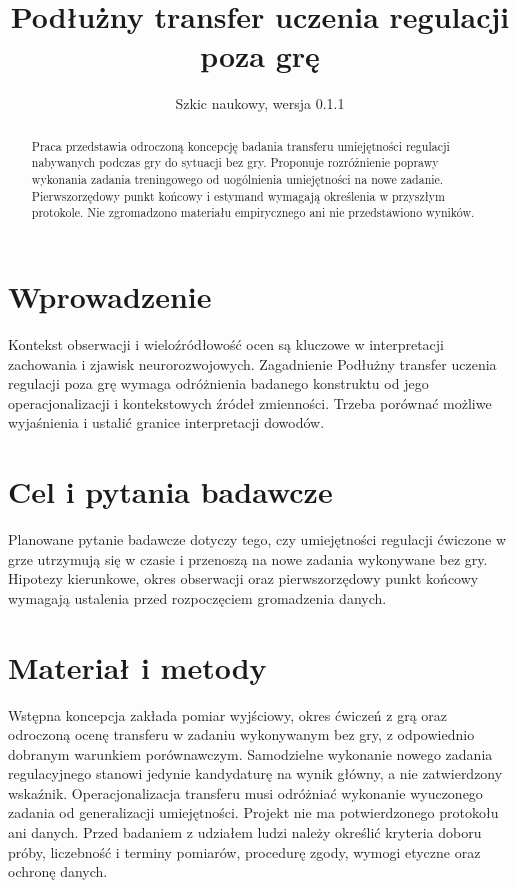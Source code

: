 \documentclass[11pt,a4paper]{article}
\title{Podłużny transfer uczenia regulacji poza grę}
\author{}
\date{Szkic naukowy, wersja 0.1.1}
\begin{document}
\maketitle

\begin{abstract}

Praca przedstawia odroczoną koncepcję badania transferu umiejętności regulacji nabywanych podczas gry do sytuacji bez gry. Proponuje rozróżnienie poprawy wykonania zadania treningowego od uogólnienia umiejętności na nowe zadanie. Pierwszorzędowy punkt końcowy i estymand wymagają określenia w przyszłym protokole. Nie zgromadzono materiału empirycznego ani nie przedstawiono wyników.

\end{abstract}

\section{Wprowadzenie}

Kontekst obserwacji i wieloźródłowość ocen są kluczowe w interpretacji zachowania i zjawisk neurorozwojowych. Zagadnienie Podłużny transfer uczenia regulacji poza grę wymaga odróżnienia badanego konstruktu od jego operacjonalizacji i kontekstowych źródeł zmienności. Trzeba porównać możliwe wyjaśnienia i ustalić granice interpretacji dowodów.

\section{Cel i pytania badawcze}

Planowane pytanie badawcze dotyczy tego, czy umiejętności regulacji ćwiczone w grze utrzymują się w czasie i przenoszą na nowe zadania wykonywane bez gry. Hipotezy kierunkowe, okres obserwacji oraz pierwszorzędowy punkt końcowy wymagają ustalenia przed rozpoczęciem gromadzenia danych.

\section{Materiał i metody}

Wstępna koncepcja zakłada pomiar wyjściowy, okres ćwiczeń z grą oraz odroczoną ocenę transferu w zadaniu wykonywanym bez gry, z odpowiednio dobranym warunkiem porównawczym. Samodzielne wykonanie nowego zadania regulacyjnego stanowi jedynie kandydaturę na wynik główny, a nie zatwierdzony wskaźnik. Operacjonalizacja transferu musi odróżniać wykonanie wyuczonego zadania od generalizacji umiejętności. Projekt nie ma potwierdzonego protokołu ani danych. Przed badaniem z udziałem ludzi należy określić kryteria doboru próby, liczebność i terminy pomiarów, procedurę zgody, wymogi etyczne oraz ochronę danych.
\end{document}
